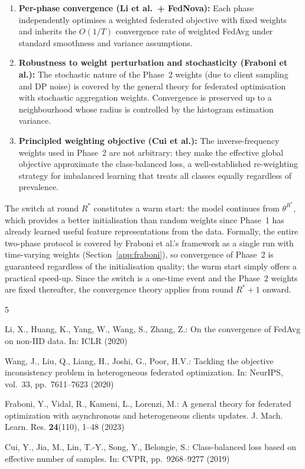 \documentclass[runningheads]{llncs}
\begin{document}
\begin{enumerate}
\item \textbf{Per-phase convergence (Li et al.\ + FedNova):}
Each phase independently optimises a weighted federated objective with fixed weights and inherits the $O(1/T)$ convergence rate of weighted FedAvg under standard smoothness and variance assumptions.

\item \textbf{Robustness to weight perturbation and stochasticity (Fraboni et al.):}
The stochastic nature of the Phase~2 weights (due to client sampling and DP noise) is covered by the general theory for federated optimisation with stochastic aggregation weights.
Convergence is preserved up to a neighbourhood whose radius is controlled by the histogram estimation variance.

\item \textbf{Principled weighting objective (Cui et al.):}
The inverse-frequency weights used in Phase~2 are not arbitrary: they make the effective global objective approximate the class-balanced loss, a well-established re-weighting strategy for imbalanced learning that treats all classes equally regardless of prevalence.
\end{enumerate}

The switch at round $R^*$ constitutes a warm start: the model continues from $\theta^{R^*}$, which provides a better initialisation than random weights since Phase~1 has already learned useful feature representations from the data.
Formally, the entire two-phase protocol is covered by Fraboni et al.'s framework as a single run with time-varying weights (Section~\ref{app:fraboni}), so convergence of Phase~2 is guaranteed regardless of the initialisation quality; the warm start simply offers a practical speed-up.
Since the switch is a one-time event and the Phase~2 weights are fixed thereafter, the convergence theory applies from round $R^*\!+\!1$ onward.

%
%
\begin{thebibliography}{5}

Li, X., Huang, K., Yang, W., Wang, S., Zhang, Z.: On the convergence of FedAvg on non-IID data. In: ICLR (2020)

Wang, J., Liu, Q., Liang, H., Joshi, G., Poor, H.V.: Tackling the objective inconsistency problem in heterogeneous federated optimization. In: NeurIPS, vol.~33, pp.~7611--7623 (2020)

Fraboni, Y., Vidal, R., Kameni, L., Lorenzi, M.: A general theory for federated optimization with asynchronous and heterogeneous clients updates. J. Mach. Learn. Res. \textbf{24}(110), 1--48 (2023)

Cui, Y., Jia, M., Lin, T.-Y., Song, Y., Belongie, S.: Class-balanced loss based on effective number of samples. In: CVPR, pp.~9268--9277 (2019)

\end{thebibliography}
\end{document}
